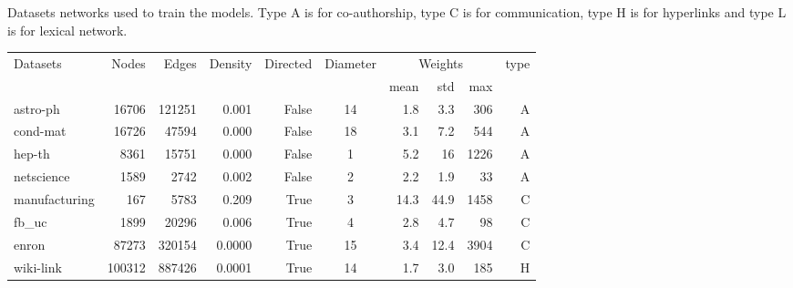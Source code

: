 
\caption{Datasets networks used to train the models. Type A is for co-authorship, type C is for communication, type H is for hyperlinks and type L is for lexical network.}

\begin{tabular}{lrrrrcrrrr}
\toprule
 Datasets     &   Nodes &   Edges &   Density & Directed  &    Diameter &   \multicolumn{3}{c}{Weights}  	& type     \\
 \cmidrule(l){7-9}  &   &   	  &   		  & 		  &  		   	&  mean & std  & max             \\
\midrule
 astro-ph      &   16706 &  121251 &     0.001    & False    &       14 &   1.8& 3.3 & 306      & A  \\
 cond-mat      &   16726 &   47594 &     0.000    & False    &       18 &   3.1& 7.2& 544      & A  \\
 hep-th        &    8361 &   15751 &     0.000    & False    &        1 &   5.2& 16& 1226      & A  \\
 netscience    &    1589 &    2742 &     0.002    & False    &        2 &   2.2& 1.9 &33       & A  \\
 manufacturing &     167 &    5783 &     0.209    & True     &        3 &  14.3& 44.9&1458    & C  \\
 fb\_uc        &    1899 &   20296 &     0.006    & True     &        4 &   2.8& 4.7& 98       & C  \\
 enron         &    87273  & 320154   &  0.0000   & True     &       15 &   3.4& 12.4&3904    & C  \\
 wiki-link     &  100312   & 887426   & 0.0001    & True     &       14 &   1.7& 3.0& 185      & H  \\
\bottomrule
\end{tabular}

